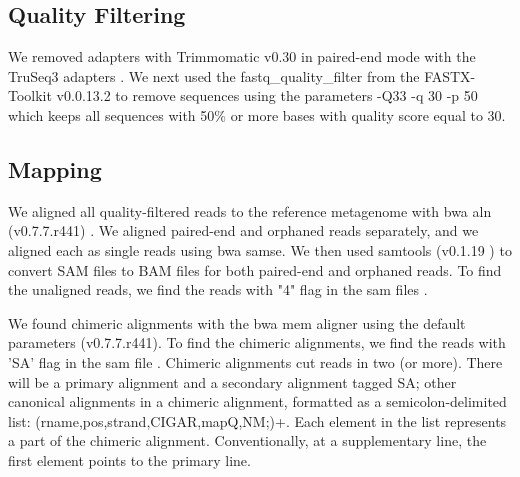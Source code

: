 \subsection*{Quality Filtering} 

We removed adapters with Trimmomatic v0.30 in paired-end mode with the
TruSeq3 adapters \cite{trim}.
We next used the fastq\_quality\_filter %
from the FASTX-Toolkit v0.0.13.2 \cite{FXtoolkit} to remove sequences  %
using the parameters -Q33 -q 30 -p 50  which keeps all sequences with 50\% or more bases with quality score equal to 30. %


\subsection*{Mapping}

We aligned all quality-filtered reads to the reference metagenome with bwa
aln (v0.7.7.r441) \cite{bwa}. %
  We aligned paired-end and orphaned reads separately,
and we aligned each as single reads using bwa samse.  We then used
samtools (v0.1.19 ) \cite{sam-stools} to convert SAM files to BAM files for both
paired-end and orphaned reads. To find the unaligned reads, we find the reads with "4" flag in the sam files \cite{sam-stools}. 

We found chimeric alignments with the bwa mem aligner using the default
parameters (v0.7.7.r441).  To find the chimeric alignments, we find the reads with 'SA' flag in the sam file \cite{sam-stools}.  
Chimeric alignments cut reads in two (or more). There will be a primary alignment and a secondary alignment tagged SA; other canonical alignments in a chimeric alignment, formatted as a semicolon-delimited list: (rname,pos,strand,CIGAR,mapQ,NM;)+. Each element in the list represents a part of the chimeric alignment. Conventionally, at a supplementary line, the first element points to the primary line.  %

